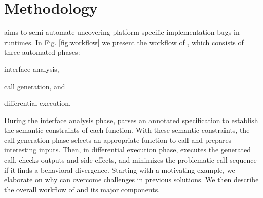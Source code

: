 \section{Methodology}
\label{sec:method}
%
\begin{figure*}
\centering

\caption{The \wazzi{} differential testing workflow.}
\label{fig:workflow}
\end{figure*}
%
\wazzi{} aims to semi-automate uncovering platform-specific \wasi{}
implementation bugs in \wasm{} runtimes.
%
In Fig. \ref{fig:workflow} we present the workflow of \wazzi{}, which consists
of three automated phases:
\begin{enumerate*}[label=(\arabic*)]
    \item interface analysis,
    \item call generation, and
    \item differential execution.
\end{enumerate*}
%
During the interface analysis phase, \wazzi{} parses an annotated \wasi{}
specification to establish the semantic constraints of each function.
%
With these semantic constraints, the call generation phase selects an
appropriate \wasi{} function to call and prepares interesting inputs.
%
Then, in differential execution phase, \wazzi{} executes the generated call,
checks outputs and side effects, and minimizes the problematic call sequence if
it finds a behavioral divergence.
%
Starting with a motivating example, we elaborate on why \wazzi{} can overcome
challenges in previous solutions.
%
We then describe the overall workflow of \wazzi{} and its major components.
%
